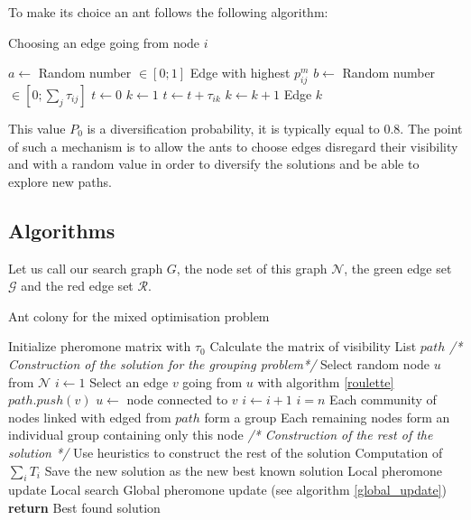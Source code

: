 \documentclass[UTF8, twoside]{EPURapport}
\begin{document}
	To make its choice an ant follows the following algorithm:
	
\begin{algorithm}
	\caption{Choosing an edge going from node $i$}
	\begin{algorithmic}[1]
		\State $a \gets $ Random number $\in \left[0;1\right]$ 
			\State \Return Edge with highest $p^m_{ij}$
		\Else
			\State $b \gets $ Random number $\in \left[0; \underset{j}{\sum}\tau_{ij}\right]$
			\State $t \gets 0$
			\State $k \gets 1$
				\State $t \gets t + \tau_{ik}$
				\State $k \gets k + 1$
			\EndWhile
			\State \Return Edge $k$
		\EndIf
	\end{algorithmic}
	\label{roulette}
\end{algorithm}

	This value $P_0$ is a diversification probability, it is typically equal to 0.8. The point of such a mechanism is to allow the ants to choose edges disregard their visibility and with a random value in order to diversify the solutions and be able to explore new paths.

\subsection{Algorithms}

	Let us call our search graph $G$, the node set of this graph $\mathscr{N}$, the green edge set $\mathscr{G}$ and the red edge set $\mathscr{R}$. 

\begin{algorithm}
  \caption{Ant colony for the mixed optimisation problem}
  \begin{algorithmic}[1]
  	  \State Initialize pheromone matrix with $\tau_0$
  	  \State Calculate the matrix of visibility
  	  \State List $path$
      		\State \textit{/* Construction of the solution for the grouping problem*/}
			\State Select random node $u$ from $\mathscr{N}$
    		\State $i \gets 1$
    		\Repeat
    			\State Select an edge $v$ going from $u$ with algorithm \ref{roulette}
   				\State $path.push(v)$
   				\State $u \gets $ node connected to $v$
   				\State $i \gets i+1$
    		\Until $i = n$
    		\State Each community of nodes linked with edged from $path$ form a group
    		\State Each remaining nodes form an individual group containing only this node
    		\State \textit{/* Construction of the rest of the solution */}
    		\State Use heuristics to construct the rest of the solution
    		\State Computation of $\underset{i}{\sum} T_i$
    			\State Save the new solution as the new best known solution
    		\EndIf
			\State Local pheromone update
        \EndFor
        \State Local search
        \State Global pheromone update (see algorithm \ref{global_update})
      \EndFor
      \State \textbf{return} Best found solution
  \end{algorithmic}
\end{algorithm}
\end{document}
